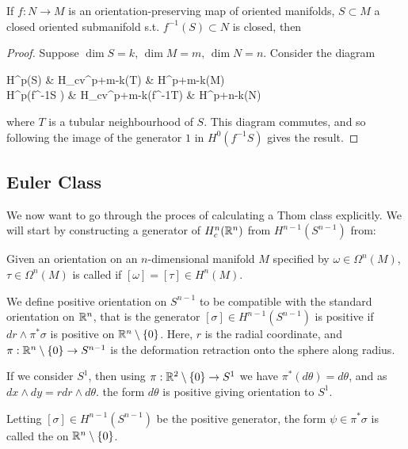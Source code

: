 \documentclass{article}
\begin{document}
\begin{prop}
	If $f:N \to M$ is an orientation-preserving map of oriented manifolds, $S \subset M$ a closed oriented submanifold s.t. $f^{-1}(S)\subset N$ is closed, then
\end{prop}
\begin{proof}
	Suppose $\dim S = k, \, \dim M = m, \, \dim N = n$. Consider the diagram 
	\begin{tkz}
		H^p(S) \arrow[r,"\mc{T}"] \arrow[d,"f^\ast"'] & H_{cv}^{p+m-k}(T) \arrow[r,"j_\ast"] \arrow[d,"f^\ast"'] & H^{p+m-k}(M) \arrow[d,"f^\ast"'] \\ 
		H^{p}(f^{-1}S ) \arrow[r,"\mc{T}"] & H_{cv}^{p+m-k}(f^{-1}T) \arrow[r,"j_\ast"] & H^{p+n-k}(N) 
	\end{tkz}
where $T$ is a tubular neighbourhood of $S$. This diagram commutes, and so following the image of the generator $1$ in $H^0(f^{-1}S)$ gives the result. 
\end{proof}

\subsection{Euler Class}
We now want to go through the proces of calculating a Thom class explicitly. We will start by constructing a generator of $H_c^n(\mathbb{R}^n)$ from $H^{n-1}(S^{n-1})$ from: 
\begin{definition}
	Given an orientation on an $n$-dimensional manifold $M$ specified by $\omega \in \Omega^n(M)$, $\tau \in \Omega^n(M)$ is called  if $[\omega] = [\tau] \in H^n(M)$. 
\end{definition} 
We define positive orientation on $S^{n-1}$ to be compatible with the standard orientation on $\mathbb{R}^n$, that is the generator $[\sigma]\in H^{n-1}(S^{n-1})$ is positive if $dr \wedge \pi^\ast \sigma$ is positive on $\mathbb{R}^n\setminus\left\{ 0 \right\}$. Here, $r$ is the radial coordinate, and $\pi:\mathbb{R}^n \setminus \left\{ 0 \right\} \to S^{n-1}$ is the deformation retraction onto the sphere along radius. 

\begin{example}
	If we consider $S^1$, then using $\pi:\mathbb{R}^2\setminus\left\{ 0 \right\} \to S^1$ we have $\pi^\ast (d\theta) = d\theta$, and as $dx \wedge dy = rdr \wedge d\theta$. the form $d\theta$ is positive giving orientation to $S^1$.
\end{example}

\begin{definition}
Letting $[\sigma]\in H^{n-1}(S^{n-1})$ be the positive generator, the form $\psi \in \pi^\ast \sigma$ is called the  on $\mathbb{R}^n \setminus \left\{ 0 \right\}$.
\end{definition}
\end{document}
